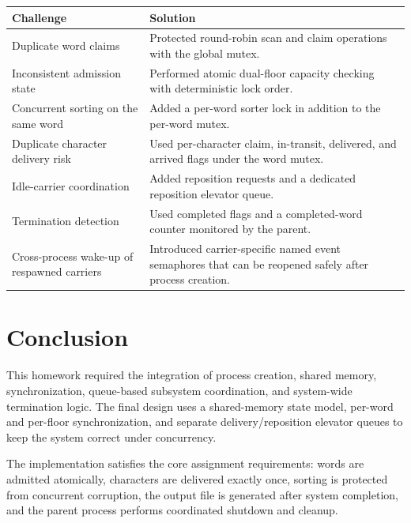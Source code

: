 \documentclass[12pt,a4paper]{article}
\begin{document}
\begin{longtable}{|P{4.0cm}|P{10.8cm}|}
\hline
\textbf{Challenge} & \textbf{Solution} \\
\hline
Duplicate word claims & Protected round-robin scan and claim operations with the global mutex. \\
\hline
Inconsistent admission state & Performed atomic dual-floor capacity checking with deterministic lock order. \\
\hline
Concurrent sorting on the same word & Added a per-word sorter lock in addition to the per-word mutex. \\
\hline
Duplicate character delivery risk & Used per-character claim, in-transit, delivered, and arrived flags under the word mutex. \\
\hline
Idle-carrier coordination & Added reposition requests and a dedicated reposition elevator queue. \\
\hline
Termination detection & Used completed flags and a completed-word counter monitored by the parent. \\
\hline
Cross-process wake-up of respawned carriers & Introduced carrier-specific named event semaphores that can be reopened safely after process creation. \\
\hline
\end{longtable}




\section{Conclusion}

This homework required the integration of process creation, shared memory, synchronization, queue-based subsystem coordination, and system-wide termination logic. The final design uses a shared-memory state model, per-word and per-floor synchronization, and separate delivery/reposition elevator queues to keep the system correct under concurrency.

The implementation satisfies the core assignment requirements: words are admitted atomically, characters are delivered exactly once, sorting is protected from concurrent corruption, the output file is generated after system completion, and the parent process performs coordinated shutdown and cleanup.
\end{document}
